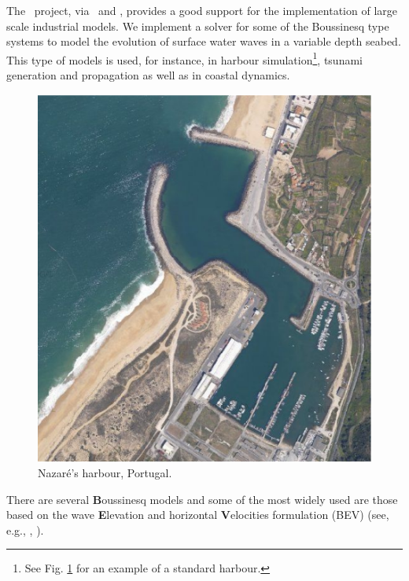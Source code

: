 The \fenics\, project, via \dolfin\, and \ffc, provides a good
support for the implementation of large scale industrial models.  We
implement a solver for some of the Boussinesq type systems to model
the evolution of surface water waves in a variable
depth seabed.  This type of models is used, for instance, in harbour
simulation\footnote{See Fig. \ref{lopes:fig:harbour} for an example of a
standard harbour.}, tsunami generation and propagation as well as in
coastal dynamics.
\begin{figure}[!htb]
\centering
\includegraphics[width=\smallwidth]{chapters/lopes/eps/nazare1.eps}
\caption{Nazar\'{e}'s harbour, Portugal.}\label{lopes:fig:harbour}
\end{figure}


There are several {\bf B}oussinesq models and some of the most widely
used are those based on the wave {\bf E}levation and horizontal {\bf
V}elocities formulation (BEV) (see, e.g., \cite{LiuWoo2004},
\cite{WalkleyBerzins2002}).


